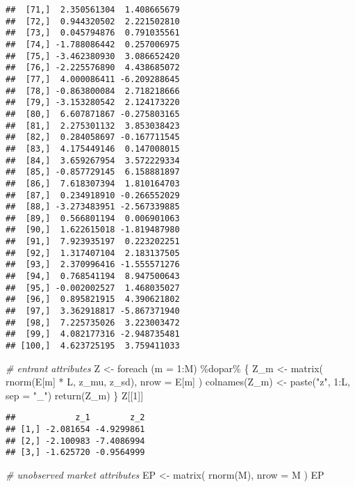 \documentclass[
]{article}
\newenvironment{Shaded}{\begin{snugshade}}{\end{snugshade}}
\newcommand{\AttributeTok}[1]{\textcolor[rgb]{0.77,0.63,0.00}{#1}}
\newcommand{\CommentTok}[1]{\textcolor[rgb]{0.56,0.35,0.01}{\textit{#1}}}
\newcommand{\DecValTok}[1]{\textcolor[rgb]{0.00,0.00,0.81}{#1}}
\newcommand{\FunctionTok}[1]{\textcolor[rgb]{0.00,0.00,0.00}{#1}}
\newcommand{\NormalTok}[1]{#1}
\newcommand{\OtherTok}[1]{\textcolor[rgb]{0.56,0.35,0.01}{#1}}
\newcommand{\SpecialCharTok}[1]{\textcolor[rgb]{0.00,0.00,0.00}{#1}}
\newcommand{\StringTok}[1]{\textcolor[rgb]{0.31,0.60,0.02}{#1}}
\begin{document}
\begin{verbatim}
##  [71,]  2.350561304  1.408665679
##  [72,]  0.944320502  2.221502810
##  [73,]  0.045794876  0.791035561
##  [74,] -1.788086442  0.257006975
##  [75,] -3.462380930  3.086652420
##  [76,] -2.225576890  4.438685072
##  [77,]  4.000086411 -6.209288645
##  [78,] -0.863800084  2.718218666
##  [79,] -3.153280542  2.124173220
##  [80,]  6.607871867 -0.275803165
##  [81,]  2.275301132  3.853038423
##  [82,]  0.284058697 -0.167711545
##  [83,]  4.175449146  0.147008015
##  [84,]  3.659267954  3.572229334
##  [85,] -0.857729145  6.158881897
##  [86,]  7.618307394  1.810164703
##  [87,]  0.234918910 -0.266552029
##  [88,] -3.273483951 -2.567339885
##  [89,]  0.566801194  0.006901063
##  [90,]  1.622615018 -1.819487980
##  [91,]  7.923935197  0.223202251
##  [92,]  1.317407104  2.183137505
##  [93,]  2.370996416 -1.555571276
##  [94,]  0.768541194  8.947500643
##  [95,] -0.002002527  1.468035027
##  [96,]  0.895821915  4.390621802
##  [97,]  3.362918817 -5.867371940
##  [98,]  7.225735026  3.223003472
##  [99,]  4.082177316 -2.948735481
## [100,]  4.623725195  3.759411033
\end{verbatim}

\begin{Shaded}
\begin{Highlighting}[]
\CommentTok{\# entrant attributes}
\NormalTok{Z }\OtherTok{\textless{}{-}}
  \FunctionTok{foreach}\NormalTok{ (}\AttributeTok{m =} \DecValTok{1}\SpecialCharTok{:}\NormalTok{M) }\SpecialCharTok{\%dopar\%}\NormalTok{ \{}
\NormalTok{    Z\_m }\OtherTok{\textless{}{-}} \FunctionTok{matrix}\NormalTok{(}
      \FunctionTok{rnorm}\NormalTok{(E[m] }\SpecialCharTok{*}\NormalTok{ L, z\_mu, z\_sd),}
      \AttributeTok{nrow =}\NormalTok{ E[m]}
\NormalTok{    )}
    \FunctionTok{colnames}\NormalTok{(Z\_m) }\OtherTok{\textless{}{-}} \FunctionTok{paste}\NormalTok{(}\StringTok{"z"}\NormalTok{, }\DecValTok{1}\SpecialCharTok{:}\NormalTok{L, }\AttributeTok{sep =} \StringTok{"\_"}\NormalTok{)}
    \FunctionTok{return}\NormalTok{(Z\_m)}
\NormalTok{  \}}
\NormalTok{Z[[}\DecValTok{1}\NormalTok{]]}
\end{Highlighting}
\end{Shaded}

\begin{verbatim}
##            z_1        z_2
## [1,] -2.081654 -4.9299861
## [2,] -2.100983 -7.4086994
## [3,] -1.625720 -0.9564999
\end{verbatim}

\begin{Shaded}
\begin{Highlighting}[]
\CommentTok{\# unobserved market attributes}
\NormalTok{EP }\OtherTok{\textless{}{-}} \FunctionTok{matrix}\NormalTok{(}
  \FunctionTok{rnorm}\NormalTok{(M),}
  \AttributeTok{nrow =}\NormalTok{ M}
\NormalTok{)}
\NormalTok{EP}
\end{Highlighting}
\end{Shaded}
\end{document}
